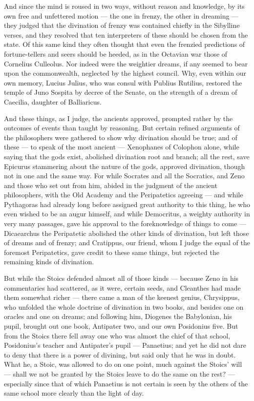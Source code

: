  And since the mind is roused in two ways, without reason and knowledge, by its own free and unfettered motion — the one in frenzy, the other in dreaming — they judged that the divination of frenzy was contained chiefly in the Sibylline verses, and they resolved that ten interpreters of these should be chosen from the state. Of this same kind they often thought that even the frenzied predictions of fortune-tellers and seers should be heeded, as in the Octavian war those of Cornelius Culleolus. Nor indeed were the weightier dreams, if any seemed to bear upon the commonwealth, neglected by the highest council. Why, even within our own memory, Lucius Julius, who was consul with Publius Rutilius, restored the temple of Juno Sospita by decree of the Senate, on the strength of a dream of Caecilia, daughter of Balliaricus.

 And these things, as I judge, the ancients approved, prompted rather by the outcomes of events than taught by reasoning. But certain refined arguments of the philosophers were gathered to show why divination should be true; and of these — to speak of the most ancient — Xenophanes of Colophon alone, while saying that the gods exist, abolished divination root and branch; all the rest, save Epicurus stammering about the nature of the gods, approved divination, though not in one and the same way. For while Socrates and all the Socratics, and Zeno and those who set out from him, abided in the judgment of the ancient philosophers, with the Old Academy and the Peripatetics agreeing — and while Pythagoras had already long before assigned great authority to this thing, he who even wished to be an augur himself, and while Democritus, a weighty authority in very many passages, gave his approval to the foreknowledge of things to come — Dicaearchus the Peripatetic abolished the other kinds of divination, but left those of dreams and of frenzy; and Cratippus, our friend, whom I judge the equal of the foremost Peripatetics, gave credit to these same things, but rejected the remaining kinds of divination.

 But while the Stoics defended almost all of those kinds — because Zeno in his commentaries had scattered, as it were, certain seeds, and Cleanthes had made them somewhat richer — there came a man of the keenest genius, Chrysippus, who unfolded the whole doctrine of divination in two books, and besides one on oracles and one on dreams; and following him, Diogenes the Babylonian, his pupil, brought out one book, Antipater two, and our own Posidonius five. But from the Stoics there fell away one who was almost the chief of that school, Posidonius's teacher and Antipater's pupil — Panaetius; and yet he did not dare to deny that there is a power of divining, but said only that he was in doubt. What he, a Stoic, was allowed to do on one point, much against the Stoics' will — shall we not be granted by the Stoics leave to do the same on the rest? — especially since that of which Panaetius is not certain is seen by the others of the same school more clearly than the light of day.

